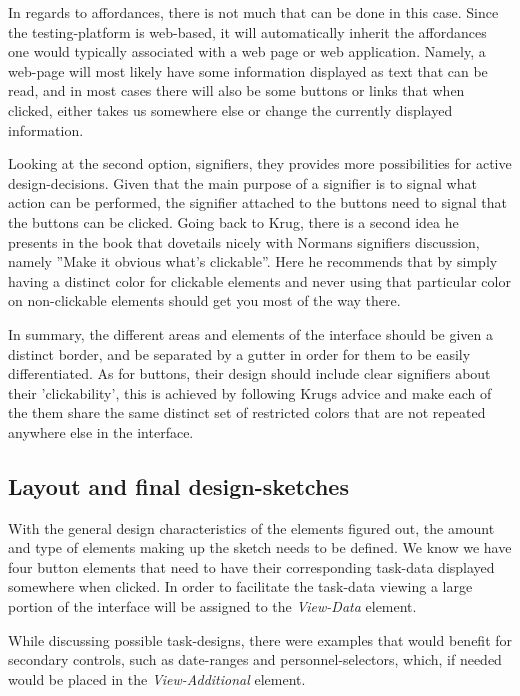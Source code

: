 {  In regards to affordances, there is not much that can be done in this
  case. Since the testing-platform is web-based, it will automatically inherit
  the affordances one would typically associated with a web page or web
  application. Namely, a web-page will most likely have some information
  displayed as text that can be read, and in most cases there will also be some
  buttons or links that when clicked, either takes us somewhere else or change
  the currently displayed information.

	Looking at the second option, signifiers, they provides more possibilities
	for active design-decisions. Given that the main purpose of a signifier is to
	signal what action can be performed, the signifier attached to the buttons
	need to signal that the buttons can be clicked. Going back to Krug, there is
	a second idea he presents in the book that dovetails nicely with Normans
	signifiers discussion, namely ''Make it obvious what's clickable''. Here he
	recommends that by simply having a distinct color for clickable elements and
	never using that particular color on non-clickable elements should get you
	most of the way there.

	In summary, the different areas and elements of the interface should be given
	a distinct border, and be separated by a gutter in order for them to be
	easily differentiated. As for buttons, their design should include clear
	signifiers about their 'clickability', this is achieved by following Krugs
	advice and make each of the them share the same distinct set of restricted
	colors that are not repeated anywhere else in the interface.

	\newpage
	\subsection{Layout and final design-sketches}

	With the general design characteristics of the elements figured out, the
	amount and type of elements making up the sketch needs to be defined. We know
	we have four button elements that need to have their corresponding task-data
	displayed somewhere when clicked. In order to facilitate the task-data
	viewing a large portion of the interface will be assigned to the
	\textit{View-Data} element.

	While discussing possible task-designs, there were examples that would
	benefit for secondary controls, such as date-ranges and personnel-selectors,
	which, if needed would be placed in the \textit{View-Additional} element.

}
